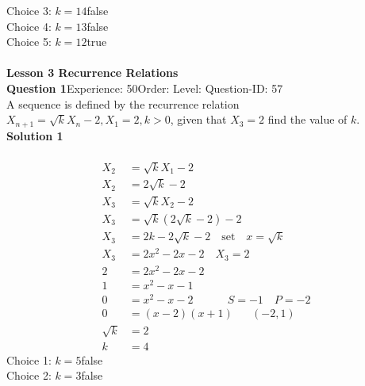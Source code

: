 \documentclass{article}
\begin{document}
Choice 3: \hspace{20pt}$k=14$\hspace{20pt}false\\
Choice 4: \hspace{20pt}$k=13$\hspace{20pt}false\\
Choice 5: \hspace{20pt}$k=12$\hspace{20pt}true\\
\\[4pt]
\noindent\large{\textbf{Lesson 3 Recurrence Relations}}\\[12pt]
\noindent\textbf{Question 1}\hspace{20pt}Experience: 50\hspace{20pt}Order: \hspace{20pt}Level: \hspace{20pt}Question-ID: 57\\[2pt]
A sequence is defined by the recurrence relation $X_{n+1}=\sqrt{k}X_n-2, X_1=2,k>0$, given that $X_3=2$ find the value of $k$.\\[4pt]
\noindent\textbf{Solution 1}\\[2pt]
\\[-35pt]\begin{align*}
X_2&=\sqrt{k}X_1-2\\[2pt]
X_2&=2\sqrt{k}-2\\[12pt]
X_3&=\sqrt{k}X_2-2\\[2pt]
X_3&=\sqrt{k}(2\sqrt{k}-2)-2\\[2pt]
X_3&=2k-2\sqrt{k}-2\quad \text{set}\quad x=\sqrt{k}\\[2pt]
X_3&=2x^2-2x-2 \quad X_3=2\\[2pt]
2&=2x^2-2x-2\\[2pt]
1&=x^2-x-1\\[2pt]
0&=x^2-x-2 \hspace{37pt} S=-1 \quad P=-2\\[2pt]
0&=(x-2)(x+1)\hspace{20pt} (-2,1)\\[2pt]
\sqrt{k}&=2\\[2pt]
k&=4
\end{align*}
Choice 1: \hspace{20pt}$k=5$\hspace{20pt}false\\
Choice 2: \hspace{20pt}$k=3$\hspace{20pt}false\\
\end{document}
